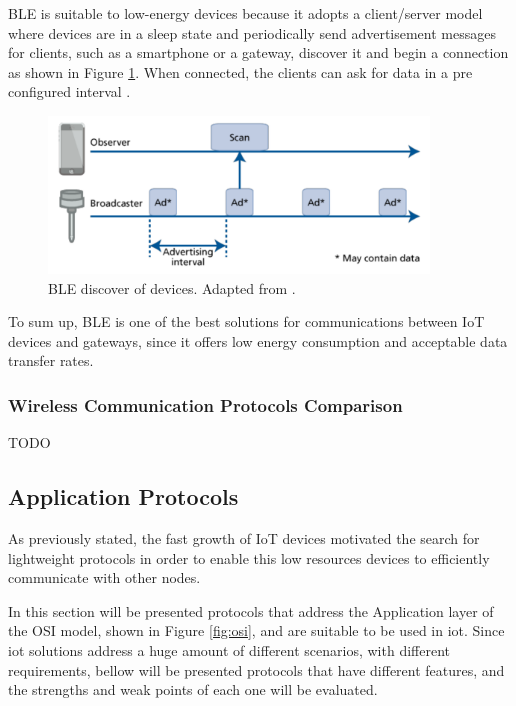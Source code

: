 BLE is suitable to low-energy devices because it adopts a client/server model where devices are in a sleep state and periodically send advertisement messages for clients, such as a smartphone or a gateway, discover it and begin a connection as shown in Figure \ref{fig:ble2}. When connected, the clients can ask for data in a pre configured interval \cite{Andersson2014}. 

\begin{figure}[H]
	\centering
	\includegraphics[width=0.9\textwidth]{figures/ble2.png}
	\caption{BLE discover of devices. Adapted from \cite{Andersson2014}.}
	\label{fig:ble2}
\end{figure}

To sum up, BLE is one of the best solutions for communications between IoT devices and gateways, since it offers low energy consumption and acceptable data transfer rates.

\subsubsection{Wireless Communication Protocols Comparison}
TODO  

\subsection{Application Protocols}

As previously stated, the fast growth of IoT devices motivated the search for lightweight protocols in order to enable this low resources devices to efficiently communicate with other nodes. 

In this section will be presented protocols that address the Application layer of the OSI model, shown in Figure \ref{fig:osi}, and are suitable to be used in \ac{iot}. Since \ac{iot} solutions address a huge amount of different scenarios, with different requirements, bellow will be presented protocols that have different features, and the strengths and weak points of each one will be evaluated.

